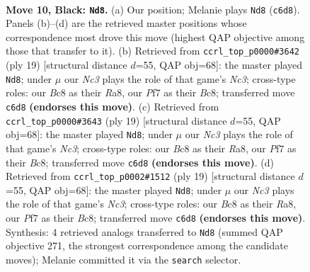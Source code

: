 \documentclass[11pt]{article}
\begin{document}
\clearpage

\begin{figure}[p]\centering
\begin{subfigure}{0.46\textwidth}\centering
\resizebox{\linewidth}{!}{%
\newchessgame
\chessboard[
  setfen={r1b2r1k/1pppqppp/p1n1pn2/3P4/2P5/2B1PNP1/PP3PBP/R2QK2R b KQ - 0 10},
  showmover=false,
  pgfstyle=straightmove, color=movearrow, markmove={c6-d8}
]}
\caption{}
\end{subfigure}\hfill
\begin{subfigure}{0.46\textwidth}\centering
\resizebox{\linewidth}{!}{%
\newchessgame
\chessboard[
  setfen={r1b2rk1/ppp1qppp/2npp3/3P4/2P1n3/2B2NP1/PP2PPBP/2RQK2R b K - 0 10},
  showmover=false,
  pgfstyle=straightmove, color=movearrow, markmove={c6-d8}
]}
\caption{}
\end{subfigure}
\\[4pt]
\begin{subfigure}{0.46\textwidth}\centering
\resizebox{\linewidth}{!}{%
\newchessgame
\chessboard[
  setfen={r1b2rk1/ppp1qppp/2npp3/3P4/2P1n3/2B2NP1/PP2PPBP/2RQK2R b K - 0 10},
  showmover=false,
  pgfstyle=straightmove, color=movearrow, markmove={c6-d8}
]}
\caption{}
\end{subfigure}\hfill
\begin{subfigure}{0.46\textwidth}\centering
\resizebox{\linewidth}{!}{%
\newchessgame
\chessboard[
  setfen={r1b2rk1/ppp1qppp/2npp3/3P4/2P1n3/2B2NP1/PP2PPBP/2RQK2R b K - 0 10},
  showmover=false,
  pgfstyle=straightmove, color=movearrow, markmove={c6-d8}
]}
\caption{}
\end{subfigure}
\caption{\textbf{Move 10, Black: \texttt{Nd8}.} (a) Our position; Melanie plays \texttt{Nd8} (\texttt{c6d8}). Panels (b)--(d) are the retrieved master positions whose correspondence most drove this move (highest QAP objective among those that transfer to it). (b) Retrieved from \texttt{ccrl\_top\_p0000\#3642} (ply 19) [structural distance $d$=55, QAP obj=68]: the master played \texttt{Nd8}; under $\mu$ our \emph{Nc3} plays the role of that game's \emph{Nc3}; cross-type roles: our \emph{B}c8 as their \emph{R}a8, our \emph{P}f7 as their \emph{B}c8; transferred move \texttt{c6d8} \textbf{(endorses this move)}. (c) Retrieved from \texttt{ccrl\_top\_p0000\#3643} (ply 19) [structural distance $d$=55, QAP obj=68]: the master played \texttt{Nd8}; under $\mu$ our \emph{Nc3} plays the role of that game's \emph{Nc3}; cross-type roles: our \emph{B}c8 as their \emph{R}a8, our \emph{P}f7 as their \emph{B}c8; transferred move \texttt{c6d8} \textbf{(endorses this move)}. (d) Retrieved from \texttt{ccrl\_top\_p0002\#1512} (ply 19) [structural distance $d$=55, QAP obj=68]: the master played \texttt{Nd8}; under $\mu$ our \emph{Nc3} plays the role of that game's \emph{Nc3}; cross-type roles: our \emph{B}c8 as their \emph{R}a8, our \emph{P}f7 as their \emph{B}c8; transferred move \texttt{c6d8} \textbf{(endorses this move)}. Synthesis: 4 retrieved analogs transferred to \texttt{Nd8} (summed QAP objective 271, the strongest correspondence among the candidate moves); Melanie committed it via the \texttt{search} selector.}
\label{fig:thought-m19}
\end{figure}
\end{document}
